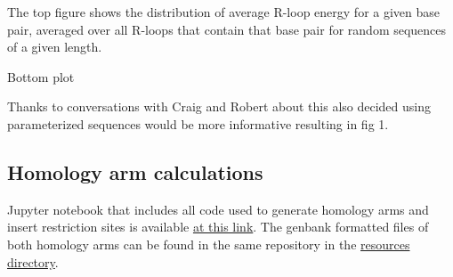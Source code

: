 \documentclass[11pt]{article}
\begin{document}
The top figure shows the distribution of average R-loop energy for a given base pair, averaged over all R-loops that contain that base pair for random sequences of a given length.

Bottom plot

Thanks to conversations with Craig and Robert about this also decided using parameterized sequences would be more informative resulting in fig 1.


\subsection{Homology arm calculations}

Jupyter notebook that includes all code used to generate homology arms and insert
restriction sites is available  \href{https://github.com/EthanHolleman/plasmid-VR-design/blob/main/notes/homology_arms.ipynb}{at this link}. The genbank formatted files of both homology arms can be found in the same repository in the \href{https://github.com/EthanHolleman/plasmid-VR-design/tree/main/resources/files/genbank}{resources directory}.


\pagebreak


\end{document}
